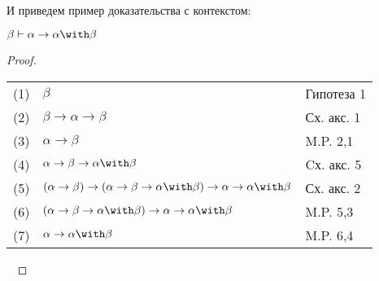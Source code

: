 И приведем пример доказательства с контекстом:
\begin{lemma}
  $\beta \vdash \alpha \to \alpha \with \beta$
\end{lemma}

\begin{proof}\

\begin{tabular}{lll}
(1) & $\beta$ & Гипотеза 1 \\
(2) & $ \beta \to \alpha \to \beta $ & Сх. акс. 1 \\
(3) & $ \alpha \to \beta $ &M.P. 2,1 \\
(4) & $ \alpha \to \beta \to \alpha \with \beta $ &Cх. акс. 5 \\
(5) & $(\alpha \to \beta) \to (\alpha \to \beta \to \alpha \with \beta) \to \alpha \to \alpha \with \beta $ &Сх. акс. 2\\
(6) & $(\alpha \to \beta \to \alpha \with \beta) \to \alpha \to \alpha \with \beta $ & M.P. 5,3\\
(7) & $\alpha \to \alpha \with \beta $ &M.P. 6,4\\
\end{tabular}\

\end{proof}